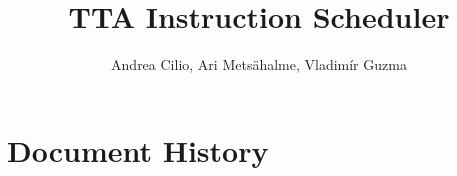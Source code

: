 \documentclass[a4paper,twoside]{tce}
\begin{document}
\author{Andrea Cilio, Ari Mets\"ahalme, Vladim\'ir Guzma}
\title{TTA Instruction Scheduler}

\maketitle

\newcommand{\parm}[1]{\textsl{#1\/}}



\chapter*{Document History}
\end{document}
